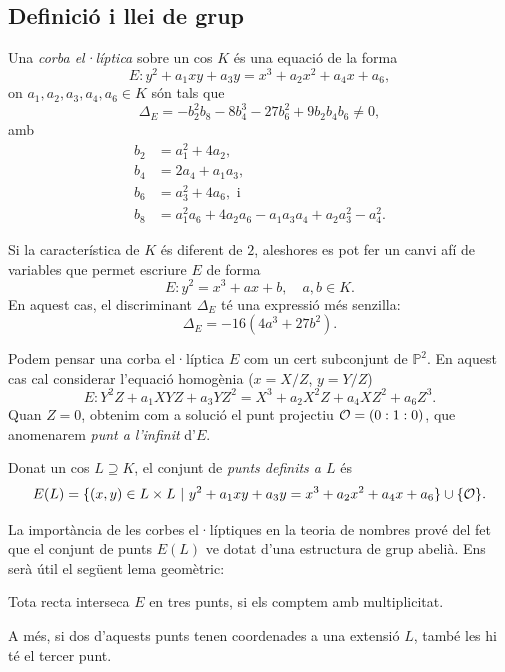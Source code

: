 \subsection{Definició i llei de grup}

\begin{definition}
 Una \emph{corba el·líptica} sobre un cos $K$ és una equació de la forma
 \[
 E\colon y^2 + a_1 xy + a_3 y = x^3 + a_2 x^2 + a_4 x + a_6,
 \]
 on $a_1, a_2, a_3, a_4, a_6\in K$ són tals que
 \[
 \Delta_E = -b_2^2b_8-8b_4^3-27b_6^2+9b_2b_4b_6 \neq 0,
 \]
 amb
 \begin{align*}
 b_2&=a_1^2+4a_2,\\
 b_4&=2a_4+a_1a_3,\\
 b_6&=a_3^2+4a_6, \text{ i}\\
 b_8&=a_1^2a_6+4a_2a_6-a_1a_3a_4+a_2a_3^2-a_4^2.
 \end{align*}
\end{definition}
\begin{remark}
 Si la característica de $K$ és diferent de $2$, aleshores es pot fer un canvi afí de variables que permet escriure $E$ de forma
 \[
 E\colon y^2 = x^3 + ax +b, \quad a,b\in K.
 \]
 En aquest cas, el discriminant $\Delta_E$ té una expressió més senzilla:
\[
\Delta_E = -16(4a^3+27b^2).
\]
\end{remark}

Podem pensar una corba el·líptica $E$ com un cert subconjunt de $\mathbb{P}^2$. En aquest cas cal considerar l'equació homogènia ($x = X/Z$, $y=Y/Z$)
\[
E\colon Y^2Z + a_1 XYZ + a_3 YZ^2 = X^3 + a_2 X^2Z + a_4 XZ^2 + a_6 Z^3.
\]
Quan $Z=0$, obtenim com a solució el punt projectiu $\mathcal{O}=(0:1:0)$, que anomenarem \emph{punt a l'infinit} d'$E$.

Donat un cos $L\supseteq K$, el conjunt de \emph{punts definits a $L$} és
\[
E(L) = \{(x,y)\in L\times L ~|~ y^2 + a_1xy + a_3 y = x^3 + a_2x^2 + a_4 x + a_6\}\cup \{\mathcal{O}\}.
\]

La importància de les corbes el·líptiques en la teoria de nombres prové del fet que el conjunt de punts $E(L)$ ve dotat d'una estructura de grup abelià. Ens serà útil el següent lema geomètric:

\begin{lemma}
Tota recta interseca $E$ en tres punts, si els comptem amb multiplicitat.

A més, si dos d'aquests punts tenen coordenades a una extensió $L$, també les hi té el tercer punt.
\end{lemma}

